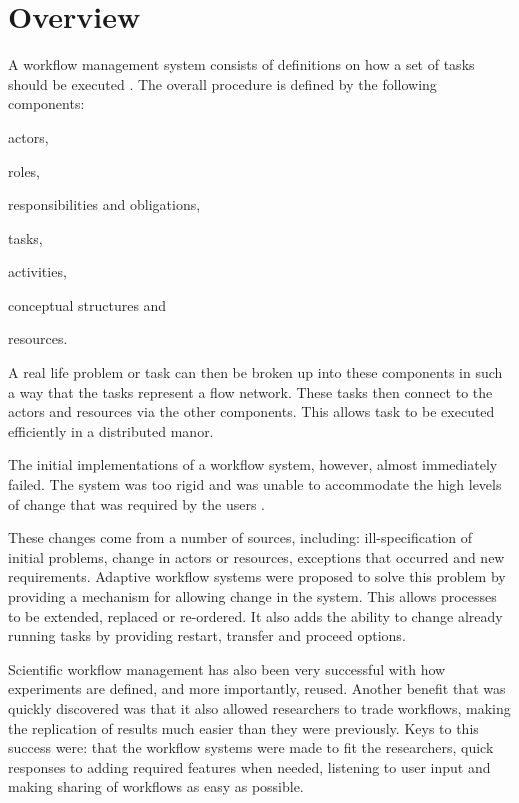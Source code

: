 \documentclass[11pt,twocolumn]{article}
\begin{document}
\section{Overview}
    A workflow management system consists of definitions
    on how a set of tasks should be executed
    \cite{springerlink:10.1007/BF00136712,vanderAalst2002125}.
    The overall procedure is defined by the following
components: \begin{inparaenum}[(i)] \item actors,
    \item roles, \item responsibilities and
    obligations, \item tasks, \item activities,\item conceptual structures
    and \item resources.\end{inparaenum}

    A real life problem or task can then be broken up into these
    components in such a way that the tasks represent a flow
    network. These tasks then connect to the actors and resources
    via the other components\cite[p.~4]{Taylor:2006:WES:1196459}.
    This allows task to be executed efficiently in a distributed manor.

    The initial implementations of a workflow system,
    however, almost immediately failed. The system was
    too rigid and was unable to accommodate the high levels
    of change that was required by the users
    \cite{Suchman:1983:OPP:357442.357445}.

    These changes come from a number of sources, including:
    ill-specification of initial problems, change in actors
    or resources, exceptions that occurred and new requirements.
    Adaptive workflow systems were proposed to solve this
    problem by providing a mechanism for allowing change in
    the system\cite{vanderAalst2002125}. This allows processes
    to be extended,
    replaced or re-ordered. It also adds the ability to change
    already running tasks by providing restart, transfer and
    proceed options.

    Scientific workflow management has also been very
    successful with how experiments
    are defined, and more importantly, reused. Another
    benefit that was quickly discovered was that it also
    allowed researchers to trade workflows, making the
    replication of results much easier than they were
    previously\cite{4721191}. Keys to this success were: that the workflow
    systems were made to fit the researchers, quick responses
    to adding required features when needed, listening
    to user input and making sharing of workflows as easy as
    possible.
\end{document}
